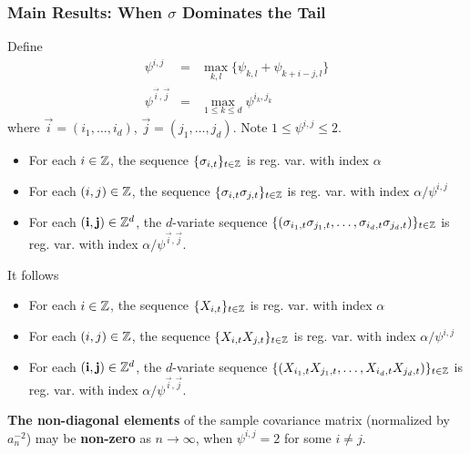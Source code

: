 \documentclass{beamer}
\begin{document}
\begin{frame}
  \frametitle{Main Results: When $\sigma$ Dominates the Tail}
  Define
  \begin{eqnarray*}
    \psi^{i,j} &=& \max_{k,l}\{\psi_{k,l} + \psi_{k+i-j, l}\} \\
    \psi^{\vec i, \vec j}
    &=&
    \max_{1 \leq k \leq d} \psi^{i_k, j_k}
  \end{eqnarray*}
  where $\vec i = (i_1, \dots, i_d)$, $\vec j = (j_1, \dots, j_d)$.
  Note $1 \leq \psi^{i,j} \leq 2$.
  \begin{itemize}
  \item For each $i \in \mathbb Z$, the sequence
    $\{\sigma_{i,t}\}_{t \in \mathbb Z}$ is reg. var. with index $\alpha$
  \item For each $(i, j) \in \mathbb Z$, the sequence
    $\{\sigma_{i,t} \sigma_{j,t}\}_{t \in \mathbb Z}$ is
    reg. var. with index $\alpha/\psi^{i,j}$
  \item For each $(\mathbf{i}, \mathbf{j}) \in \mathbb Z^d$, the $d$-variate
    sequence
    $\{(\sigma_{i_1,t} \sigma_{j_1,t}, \dots, \sigma_{i_d,t} \sigma_{j_d,t})\}_{t \in \mathbb Z}$ is
    reg. var. with index $\alpha/\psi^{\vec i, \vec j}$.
  \end{itemize}
\end{frame}

\begin{frame}
  It follows
  \begin{itemize}
  \item For each $i \in \mathbb Z$, the sequence
    $\{X_{i,t}\}_{t \in \mathbb Z}$ is reg. var. with index $\alpha$
  \item For each $(i, j) \in \mathbb Z$, the sequence
    $\{X_{i,t} X_{j,t}\}_{t \in \mathbb Z}$ is
    reg. var. with index $\alpha/\psi^{i,j}$
  \item For each $(\mathbf{i}, \mathbf{j}) \in \mathbb Z^d$, the $d$-variate
    sequence
    $\{(X_{i_1,t} X_{j_1,t}, \dots, X_{i_d,t} X_{j_d,t})\}_{t \in \mathbb Z}$ is
    reg. var. with index $\alpha/\psi^{\vec i, \vec j}$.
  \end{itemize}
  {\bf The non-diagonal elements} of the sample covariance
    matrix (normalized by $a_n^{-2}$) may be {\bf non-zero} as
    $n \to \infty$, when $\psi^{i,j} = 2$ for some $i \neq j$.
\end{frame}
\end{document}
